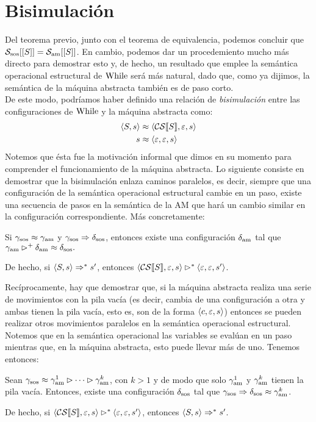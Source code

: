 \section{Bisimulación}

Del teorema previo, junto con el teorema de equivalencia, podemos concluir que $\mathcal{S}_{\mathrm{sos}}[[S]] = \mathcal{S}_{\mathrm{am}}[[S]]$. En cambio, podemos dar un procedemiento mucho más directo para demostrar esto y, de hecho, un resultado que emplee la semántica operacional estructural de $\mathrm{While}$ será más natural, dado que, como ya dijimos, la semántica de la máquina abstracta también es de paso corto.
\\

De este modo, podríamos haber definido una relación de \textit{bisimulación} entre las configuraciones de $\mathrm{While}$ y la máquina abstracta como:
\begin{align*}
    \langle S, s \rangle & \approx \langle \mathcal{CS}[\![S]\!], \varepsilon, s \rangle\\
    s & \approx \langle \varepsilon, \varepsilon, s \rangle
\end{align*}
Notemos que ésta fue la motivación informal que dimos en su momento para comprender el funcionamiento de la máquina abstracta. Lo siguiente consiste en demostrar que la bisimulación enlaza caminos paralelos, es decir, siempre que una configuración de la semántica operacional estructural cambie en un paso, existe una secuencia de pasos en la semántica de la AM que hará un cambio similar en la configuración correspondiente. Más concretamente:
\begin{lema}
Si $\gamma_{\mathrm{sos}} \approx \gamma_{\mathrm{am}}$ y $\gamma_{\mathrm{sos}}\Rightarrow\delta_{\mathrm{sos}}$, entonces existe una configuración $\delta_{\mathrm{am}}$ tal que $\gamma_{\mathrm{am}} \rhd^+ \delta_{\mathrm{am}} \approx \delta_{\mathrm{sos}}.$ 

De hecho, si $\langle S, s \rangle\Rightarrow^* s'$, entonces $\langle \mathcal{CS}[\![S]\!], \varepsilon, s \rangle\rhd^* \langle \varepsilon, \varepsilon, s' \rangle$.
\end{lema}

Recíprocamente, hay que demostrar que, si la máquina abstracta realiza una serie de movimientos con la pila vacía (es decir, cambia de una configuración a otra y ambas tienen la pila vacía, esto es, son de la forma $\langle c, \varepsilon, s \rangle$) entonces se pueden realizar otros movimientos paralelos en la semántica operacional estructural. Notemos que en la semántica operacional las variables se evalúan en un paso mientras que, en la máquina abstracta, esto puede llevar más de uno. Tenemos entonces:
\begin{lema}
Sean $\gamma_{\mathrm{sos}}\approx \gamma_{\mathrm{am}}^1 \rhd \dots \rhd \gamma_{\mathrm{am}}^k$, con $k>1$ y de modo que solo $\gamma_{\mathrm{am}}^1$ y $\gamma_{\mathrm{am}}^k$ tienen la pila vacía. Entonces, existe una configuración $\delta_{\mathrm{sos}}$ tal que $\gamma_{\mathrm{sos}}\Rightarrow \delta_{\mathrm{sos}}\approx \gamma_{\mathrm{am}}^k$. 

De hecho, si $\langle \mathcal{CS}[\![S]\!], \varepsilon, s \rangle\rhd^* \langle \varepsilon, \varepsilon, s' \rangle$, entonces $\langle S, s \rangle\Rightarrow^* s'$.
\end{lema}

